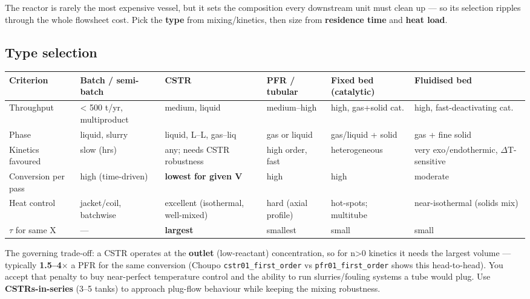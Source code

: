 \documentclass[11pt,a4paper]{article}
\begin{document}
The reactor is rarely the most expensive vessel, but it sets the
composition every downstream unit must clean up --- so its selection
ripples through the whole flowsheet cost. Pick the \textbf{type} from
mixing/kinetics, then size from \textbf{residence time} and \textbf{heat
load}.

\hypertarget{type-selection}{%
\subsection{Type selection}\label{type-selection}}

\begin{longtable}[]{@{}>{\raggedright\arraybackslash}p{\dimexpr(\linewidth-12\tabcolsep)/6\relax}>{\raggedright\arraybackslash}p{\dimexpr(\linewidth-12\tabcolsep)/6\relax}>{\raggedright\arraybackslash}p{\dimexpr(\linewidth-12\tabcolsep)/6\relax}>{\raggedright\arraybackslash}p{\dimexpr(\linewidth-12\tabcolsep)/6\relax}>{\raggedright\arraybackslash}p{\dimexpr(\linewidth-12\tabcolsep)/6\relax}>{\raggedright\arraybackslash}p{\dimexpr(\linewidth-12\tabcolsep)/6\relax}@{}}
\toprule\noalign{}
Criterion & Batch / semi-batch & CSTR & PFR / tubular & Fixed bed
(catalytic) & Fluidised bed \\
\midrule\noalign{}
\endhead
\bottomrule\noalign{}
\endlastfoot
Throughput & \textless{} 500 t/yr, multiproduct & medium, liquid &
medium--high & high, gas+solid cat. & high, fast-deactivating cat. \\
Phase & liquid, slurry & liquid, L--L, gas--liq & gas or liquid &
gas/liquid + solid & gas + fine solid \\
Kinetics favoured & slow (hrs) & any; needs CSTR robustness & high
order, fast & heterogeneous & very exo/endothermic, \(\Delta\)T-sensitive \\
Conversion per pass & high (time-driven) & \textbf{lowest for given V} &
high & high & moderate \\
Heat control & jacket/coil, batchwise & excellent (isothermal,
well-mixed) & hard (axial profile) & hot-spots; multitube &
near-isothermal (solids mix) \\
\(\tau\) for same X & --- & \textbf{largest} & smallest & small & small \\
\end{longtable}

The governing trade-off: a CSTR operates at the \textbf{outlet}
(low-reactant) concentration, so for n\textgreater0 kinetics it needs
the largest volume --- typically \textbf{1.5--4\(\times\)} a PFR for the same
conversion (Choupo \texttt{cstr01\_first\_order} vs
\texttt{pfr01\_first\_order} shows this head-to-head). You accept that
penalty to buy near-perfect temperature control and the ability to run
slurries/fouling systems a tube would plug. Use \textbf{CSTRs-in-series}
(3--5 tanks) to approach plug-flow behaviour while keeping the mixing
robustness.
\end{document}
